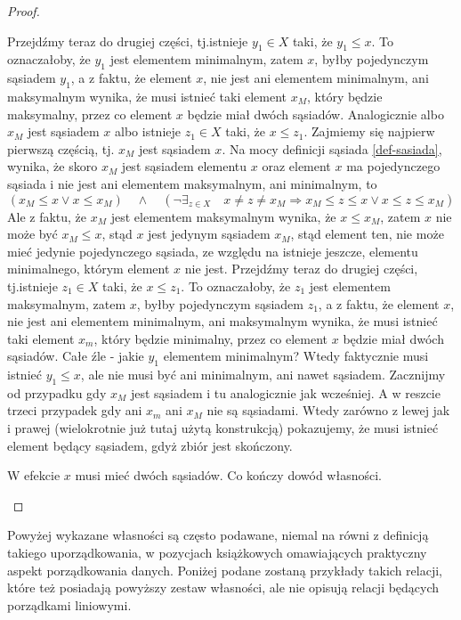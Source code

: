 \documentclass[12pt,a4paper]{report}
\begin{document}
\begin{proof}
\begin{enumerate}
\begin{itemize}
{\color{blue}Przejdźmy teraz do drugiej części, tj.istnieje $y_1 \in X$ taki, że $y_1 \leq x$. To oznaczałoby, że $y_1$ jest elementem minimalnym, zatem $x$, byłby pojedynczym sąsiadem $y_1$, a z faktu, że element $x$, nie jest ani elementem minimalnym, ani maksymalnym wynika, że musi istnieć taki element $x_M$, który będzie maksymalny, przez co element $x$ będzie miał dwóch sąsiadów. 
Analogicznie albo $x_M$ jest sąsiadem $x$ albo istnieje $z_1 \in X$ taki, że $x \leq z_1$. 
Zajmiemy się najpierw pierwszą częścią, tj. $x_M$ jest sąsiadem $x$. Na mocy definicji sąsiada \ref{def-sasiada}, wynika, że skoro $x_M$ jest sąsiadem elementu $x$ oraz element $x$ ma pojedynczego sąsiada i nie jest ani elementem maksymalnym, ani minimalnym, to  
$$
\left(x_M \leq x \lor x \leq x_M\right) \quad \land \quad \left(\lnot \exists_{z \in X}  \quad x\neq z \neq x_M \Rightarrow   x_M \leq z \leq x \lor x \leq z \leq x_M \right) 
$$
Ale z faktu, że $x_M$ jest elementem maksymalnym wynika, że $x \leq x_M$, zatem $x$ nie może być $x_M \leq x$, stąd $x$ jest  jedynym sąsiadem $x_M$, stąd element ten, nie może mieć jedynie pojedynczego sąsiada, ze względu na istnieje jeszcze, elementu minimalnego, którym element $x$ nie jest.
Przejdźmy teraz do drugiej części, tj.istnieje $z_1 \in X$ taki, że $x \leq z_1$. To oznaczałoby, że $z_1$ jest elementem maksymalnym, zatem $x$, byłby pojedynczym sąsiadem $z_1$, a z faktu, że element $x$, nie jest ani elementem minimalnym, ani maksymalnym wynika, że musi istnieć taki element $x_m$, który będzie minimalny, przez co element $x$ będzie miał dwóch sąsiadów. \color{red} Całe źle - jakie $y_1$ elementem minimalnym? Wtedy faktycznie musi istnieć $y_1 \leq x$, ale nie musi być ani minimalnym, ani nawet sąsiadem. Zacznijmy od przypadku gdy $x_M$ jest sąsiadem i tu analogicznie jak wcześniej. A w reszcie trzeci przypadek gdy ani $x_m$ ani $x_M$ nie są sąsiadami. Wtedy zarówno z lewej jak i prawej (wielokrotnie już tutaj użytą konstrukcją) pokazujemy, że musi istnieć element będący sąsiadem, gdyż zbiór jest skończony. }

W efekcie $x$ musi mieć dwóch sąsiadów. Co kończy dowód własności.
\end{itemize}

\end{enumerate}
\end{proof}

Powyżej wykazane własności są często podawane, niemal na równi z definicją takiego uporządkowania, w pozycjach książkowych omawiających praktyczny aspekt porządkowania danych. Poniżej podane zostaną przykłady takich relacji, które też posiadają powyższy zestaw własności, ale nie opisują relacji będących porządkami liniowymi. 
 
\end{document}
